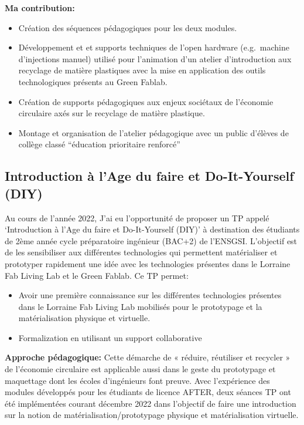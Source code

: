 \documentclass[
  11pt,
]{article}
\providecommand{\tightlist}{%
  \setlength{\itemsep}{0pt}\setlength{\parskip}{0pt}}\usepackage{longtable,booktabs,array}
\begin{document}
\textbf{Ma contribution:}

\begin{itemize}
\tightlist
\item
  Création des séquences pédagogiques pour les deux modules.
\item
  Développement et et supports techniques de l'open hardware
  (e.g.~machine d'injections manuel) utilisé pour l'animation d'un
  atelier d'introduction aux recyclage de matière plastiques avec la
  mise en application des outils technologiques présents au Green
  Fablab.
\item
  Création de supports pédagogiques aux enjeux sociétaux de l'économie
  circulaire axés sur le recyclage de matière plastique.
\item
  Montage et organisation de l'atelier pédagogique avec un public
  d'élèves de collège classé ``éducation prioritaire renforcé''
\end{itemize}

\hypertarget{introduction-uxe0-lage-du-faire-et-do-it-yourself-diy}{%
\subsection{Introduction à l'Age du faire et Do-It-Yourself
(DIY)}\label{introduction-uxe0-lage-du-faire-et-do-it-yourself-diy}}

Au cours de l'année 2022, J'ai eu l'opportunité de proposer un TP appelé
`Introduction à l'Age du faire et Do-It-Yourself (DIY)' à destination
des étudiants de 2ème année cycle préparatoire ingénieur (BAC+2) de
l'ENSGSI. L'objectif est de les sensibiliser aux différentes
technologies qui permettent matérialiser et prototyper rapidement une
idée avec les technologies présentes dans le Lorraine Fab Living Lab et
le Green Fablab. Ce TP permet:

\begin{itemize}
\tightlist
\item
  Avoir une première connaissance sur les différentes technologies
  présentes dans le Lorraine Fab Living Lab mobilisés pour le
  prototypage et la matérialisation physique et virtuelle.
\item
  Formalization en utilisant un support collaborative
\end{itemize}

\textbf{Approche pédagogique: } Cette démarche de « réduire, réutiliser
et recycler » de l'économie circulaire est applicable aussi dans le
geste du prototypage et maquettage dont les écoles d'ingénieurs font
preuve. Avec l'expérience des modules développés pour les étudiants de
licence AFTER, deux séances TP ont été implémentées courant décembre
2022 dans l'objectif de faire une introduction sur la notion de
matérialisation/prototypage physique et matérialisation virtuelle.
\end{document}
